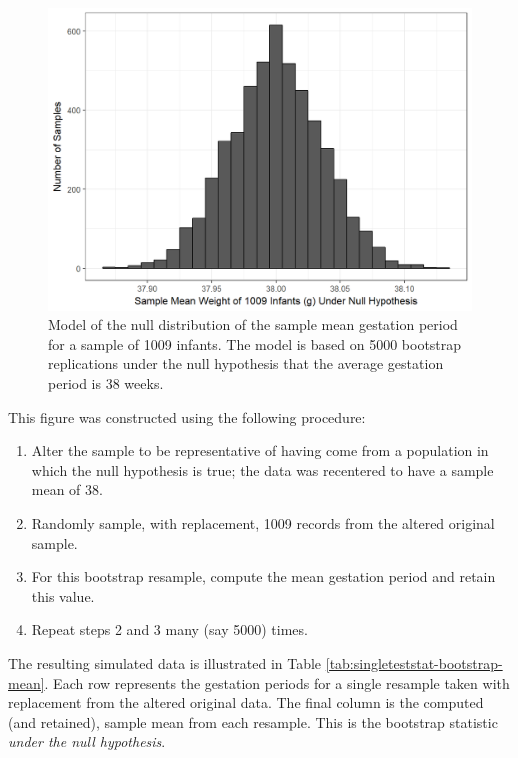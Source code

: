 \documentclass[]{book}
\providecommand{\tightlist}{%
  \setlength{\itemsep}{0pt}\setlength{\parskip}{0pt}}
\theoremstyle{plain}
\theoremstyle{mydefn}
\theoremstyle{myexmpl}
\theoremstyle{remark}
\begin{document}
\begin{figure}

{\centering \includegraphics[width=0.8\linewidth]{./Images/singleteststat-null-mean-1} 

}

\caption{Model of the null distribution of the sample mean gestation period for a sample of 1009 infants. The model is based on 5000 bootstrap replications under the null hypothesis that the average gestation period is 38 weeks.}\label{fig:singleteststat-null-mean}
\end{figure}

This figure was constructed using the following procedure:

\begin{enumerate}
\def\labelenumi{\arabic{enumi}.}
\tightlist
\item
  Alter the sample to be representative of having come from a population
  in which the null hypothesis is true; the data was recentered to have
  a sample mean of 38.
\item
  Randomly sample, with replacement, 1009 records from the altered
  original sample.
\item
  For this bootstrap resample, compute the mean gestation period and
  retain this value.
\item
  Repeat steps 2 and 3 many (say 5000) times.
\end{enumerate}

The resulting simulated data is illustrated in Table
\ref{tab:singleteststat-bootstrap-mean}. Each row represents the
gestation periods for a single resample taken with replacement from the
altered original data. The final column is the computed (and retained),
sample mean from each resample. This is the bootstrap statistic
\emph{under the null hypothesis}.
\end{document}
